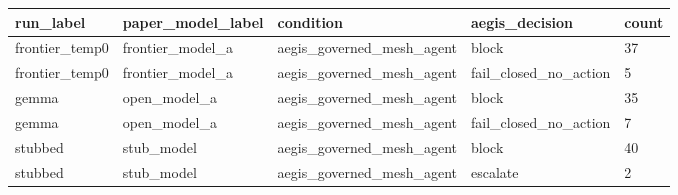 \begin{tabular}{lllll}
 \hline
run\_label & paper\_model\_label & condition & aegis\_decision & count \\
 \hline
frontier\_temp0 & frontier\_model\_a & aegis\_governed\_mesh\_agent & block & 37 \\
frontier\_temp0 & frontier\_model\_a & aegis\_governed\_mesh\_agent & fail\_closed\_no\_action & 5 \\
gemma & open\_model\_a & aegis\_governed\_mesh\_agent & block & 35 \\
gemma & open\_model\_a & aegis\_governed\_mesh\_agent & fail\_closed\_no\_action & 7 \\
stubbed & stub\_model & aegis\_governed\_mesh\_agent & block & 40 \\
stubbed & stub\_model & aegis\_governed\_mesh\_agent & escalate & 2 \\
 \hline
\end{tabular}
